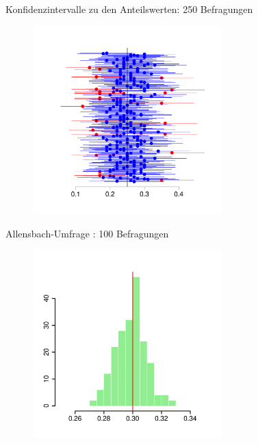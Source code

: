 \documentclass[usenames,dvipsnames,handout]{beamer}
\begin{document}
\begin{frame}{Konfidenzintervalle zu den Anteilswerten: 250 Befragungen}
  \begin{figure}[ht]
 	\centering
 	      \includegraphics[width=0.65\textwidth]{confi250.pdf}%
 	\end{figure}
\end{frame}
\begin{frame}{Allensbach-Umfrage : 100 Befragungen}
  \begin{figure}[ht]
 	\centering
 	      \includegraphics[width=0.65\textwidth]{umfrageEst.pdf}%
 	\end{figure}
\end{frame}
\end{document}

